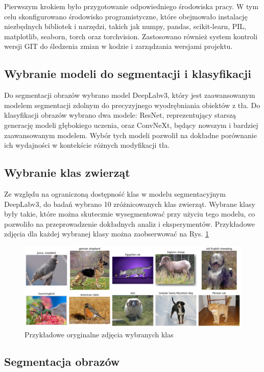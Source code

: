 Pierwszym krokiem było przygotowanie odpowiedniego środowiska pracy. W tym celu skonfigurowano środowisko 
programistyczne, które obejmowało instalację niezbędnych bibliotek i narzędzi, takich jak numpy, pandas, scikit-learn, 
PIL, matplotlib, seaborn, torch oraz torchvision. Zastosowano również system kontroli wersji GIT do śledzenia zmian w 
kodzie i zarządzania wersjami projektu.

\subsection*{Wybranie modeli do segmentacji i klasyfikacji}

Do segmentacji obrazów wybrano model DeepLabv3, który jest zaawansowanym modelem segmentacji zdolnym do precyzyjnego 
wyodrębniania obiektów z tła. Do klasyfikacji obrazów wybrano dwa modele: ResNet, reprezentujący starszą generację 
modeli głębokiego uczenia, oraz ConvNeXt, będący nowszym i bardziej zaawansowanym modelem. Wybór tych modeli pozwolił 
na dokładne porównanie ich wydajności w kontekście różnych modyfikacji tła.

\subsection*{Wybranie klas zwierząt}

Ze względu na ograniczoną dostępność klas w modelu segmentacyjnym DeepLabv3, do badań wybrano 10 zróżnicowanych klas 
zwierząt. Wybrane klasy były takie, które można skutecznie wysegmentować przy użyciu tego modelu, co pozwoliło na 
przeprowadzenie dokładnych analiz i eksperymentów. Przykładowe zdjęcia dla każdej wybranej klasy można zaobserwować na Rys. \ref{rys:classes}

\begin{figure}
	\centering\includegraphics[width=.9\textwidth]{img/classes}
	\caption{Przykładowe oryginalne zdjęcia wybranych klas}  \label{rys:classes}
\end{figure}

\subsection*{Segmentacja obrazów}

